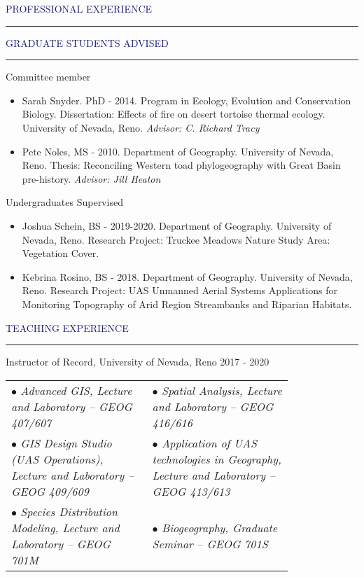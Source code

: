 \documentclass{resume} %
\renewenvironment{rSection}[1]{
\sectionskip
\textcolor{MidnightBlue}{\MakeUppercase{#1}}
\sectionlineskip
\hrule
\begin{list}{}{
\setlength{\leftmargin}{1.5em}
}
\item[]
}{
\end{list}
}
\begin{document}
\begin{rSection}{Professional Experience}
\begin{rSection}{Graduate Students Advised}
\begin{rSubsection}{Committee member}{}{}{}
\begin{itemize}
\item Sarah Snyder. PhD - 2014. Program in Ecology, Evolution and Conservation Biology. Dissertation: Effects of fire on desert tortoise thermal ecology. University of Nevada, Reno. \textit{ Advisor: C. Richard Tracy}
\item Pete Noles, MS - 2010. Department of Geography. University of Nevada, Reno. Thesis: Reconciling Western toad phylogeography with Great Basin pre-history. \textit{Advisor: Jill Heaton}
\end{itemize}
\end{rSubsection}

\begin{rSubSection}{Undergraduates Supervised}
\begin{itemize}
\item Joshua Schein, BS - 2019-2020. Department of Geography. University of Nevada, Reno. Research Project: Truckee Meadows Nature Study Area: Vegetation Cover.

\item Kebrina Rosino, BS - 2018. Department of Geography. University of Nevada, Reno. Research Project: UAS Unmanned Aerial Systems Applications for Monitoring Topography of Arid Region Streambanks and Riparian Habitats.
\end{itemize}
\end{rSubSection}
 \end{rSection}
 \pagebreak
\begin{rSection}{Teaching Experience}
Instructor of Record, University of Nevada, Reno \hfill 2017 - 2020
\begin{center}
\begin{tabular}{p{0.4\linewidth}p{0.4\linewidth}}
     $\bullet$   \textit{Advanced GIS, Lecture and Laboratory -- GEOG 407/607} &
     $\bullet$   \textit{Spatial Analysis, Lecture and Laboratory -- GEOG 416/616} \\
      $\bullet$   \textit{GIS Design Studio (UAS Operations), Lecture and Laboratory -- GEOG 409/609} &
      $\bullet$   \textit{Application of UAS technologies in Geography, Lecture and Laboratory -- GEOG 413/613} \\
      $\bullet$   \textit{Species Distribution Modeling, Lecture and Laboratory -- GEOG 701M} &
        $\bullet$   \textit{Biogeography, Graduate Seminar -- GEOG 701S}\\

\end{tabular}
\end{center}


\end{rSection}
\end{rSection}
\end{document}
